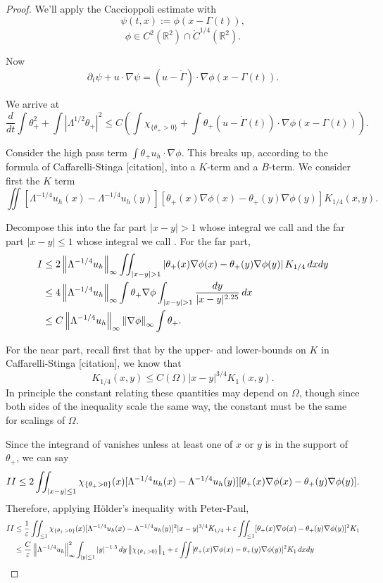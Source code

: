 \documentclass[11pt]{amsart}
\theoremstyle{remark}
\newcommand{\R}{\mathbb{R}}
\newcommand{\eps}{\varepsilon}
\newcommand{\norm}[1]{\left\lVert#1\right\rVert}
\newcommand{\paren}[1]{\left( #1 \right)}
\newcommand{\abs}[1]{\left\lvert #1 \right\rvert}
\newcommand{\del}{\partial}
\newcommand{\grad}{\nabla}
\newcommand{\ddt}{\frac{d}{dt}}
\newcommand{\indic}[1]{\chi_{\{#1\}}}
\newcommand{\uhigh}{u_h}
\newcommand{\Rom}[1]{\MakeUppercase{\romannumeral #1}}
\begin{document}
\begin{proof}
We'll apply the Caccioppoli estimate with
\[ \psi(t,x) := \phi(x - \Gamma(t)), \]
\[ \phi \in C^2(\R^2) \cap \dot{C}^{1/4}(\R^2). \]

Now
\[ \del_t \psi + u\cdot\grad \psi = (u - \dot{\Gamma})\cdot \grad \phi(x-\Gamma(t)). \]

We arrive at
\[ \ddt \int \theta_+^2 + \int \abs{\Lambda^{1/2} \theta_+}^2 \leq C \paren{ \int \indic{\theta_+ > 0} + \int \theta_+ (u-\dot{\Gamma}(t)) \cdot \grad\phi(x-\Gamma(t)) }. \]

Consider the high pass term $\int \theta_+ \uhigh\cdot\grad\phi$.  This breaks up, according to the formula of Caffarelli-Stinga [citation], into a $K$-term and a $B$-term.  We consider first the $K$ term
\[ \iint [\Lambda^{-1/4} \uhigh(x)-\Lambda^{-1/4}\uhigh(y)][\theta_+(x)\grad\phi(x)-\theta_+(y)\grad\phi(y)] K_{1/4}(x,y). \]

Decompose this into the far part $|x-y|>1$ whose integral we call \Rom{1} and the far part $|x-y|\leq 1$ whose integral we call \Rom{2}.  For the far part,
\begin{align*} 
\Rom{1} &\leq 2 \norm{\Lambda^{-1/4} \uhigh}_\infty \iint_{|x-y|>1} \abs{\theta_+(x)\grad\phi(x)-\theta_+(y)\grad\phi(y)} K_{1/4} \,dxdy
\\ &\leq 4 \norm{\Lambda^{-1/4} \uhigh}_\infty \int \theta_+\grad\phi \int_{|x-y|>1} \frac{dy}{|x-y|^{2.25}} \,dx
\\ &\leq C \norm{\Lambda^{-1/4} \uhigh}_\infty \norm{\grad\phi}_\infty  \int \theta_+.
\end{align*}

For the near part, recall first that by the upper- and lower-bounds on $K$ in Caffarelli-Stinga [citation], we know that
\[ K_{1/4}(x,y) \leq C(\Omega) |x-y|^{3/4} K_1(x,y). \]
In principle the constant relating these quantities may depend on $\Omega$, though since both sides of the inequality scale the same way, the constant must be the same for scalings of $\Omega$.  

Since the integrand of \Rom{2} vanishes unless at least one of $x$ or $y$ is in the support of $\theta_+$, we can say
\[ \Rom{2} \leq 2 \iint_{|x-y|\leq 1} \indic{\theta_+>0}(x) [\Lambda^{-1/4} \uhigh(x)-\Lambda^{-1/4}\uhigh(y)][\theta_+(x)\grad\phi(x)-\theta_+(y)\grad\phi(y)]. \]
Therefore, applying H\"{o}lder's inequality with Peter-Paul,
\begin{align*}
\Rom{2} &\leq \frac{1}{\eps}\iint _{\leq 1} \indic{\theta_+>0}(x) [\Lambda^{-1/4} \uhigh(x)-\Lambda^{-1/4}\uhigh(y)]^2 |x-y|^{3/4} K_{1/4} + \eps \iint_{\leq 1} [\theta_+(x)\grad\phi(x)-\theta_+(y)\grad\phi(y)]^2 K_1
\\ &\leq \frac{C}{\eps} \norm{\Lambda^{-1/4} \uhigh}_\infty^2 \int_{|y|\leq 1} |y|^{-1.5} \,dy \norm{\indic{\theta_+>0}}_1 + \eps \iint [\theta_+(x)\grad\phi(x)-\theta_+(y)\grad\phi(y)]^2 K_1 \,dxdy
\end{align*}


\end{proof}
\end{document}
